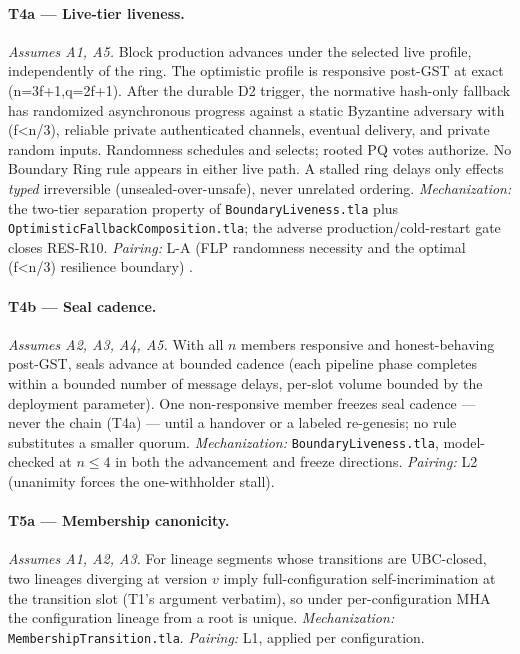 \documentclass[11pt]{article}
\newcommand{\code}[1]{\texttt{#1}}
\begin{document}
\paragraph{T4a --- Live-tier liveness.}
\textit{Assumes A1, A5.} Block production advances under the selected live
profile, independently of the ring. The optimistic profile is responsive
post-GST at exact (n=3f+1,q=2f+1). After the durable D2 trigger, the
normative hash-only fallback has randomized asynchronous progress against a
static Byzantine adversary with (f<n/3), reliable private authenticated
channels, eventual delivery, and private random inputs. Randomness schedules
and selects; rooted PQ votes authorize. No Boundary Ring rule appears in
either live path. A stalled ring delays only effects \emph{typed}
irreversible (unsealed-over-unsafe), never unrelated ordering.
\textit{Mechanization:} the two-tier separation property of
\code{BoundaryLiveness.tla} plus
\code{OptimisticFallbackComposition.tla}; the adverse production/cold-restart
gate closes RES-R10. \textit{Pairing:} L-A (FLP randomness necessity and the
optimal (f<n/3) resilience boundary) \cite{hashasync,hashasynctheory}.

\paragraph{T4b --- Seal cadence.}
\textit{Assumes A2, A3, A4, A5.} With all \(n\) members responsive and
honest-behaving post-GST, seals advance at bounded cadence (each pipeline
phase completes within a bounded number of message delays, per-slot volume
bounded by the deployment parameter). One non-responsive member freezes
seal cadence --- never the chain (T4a) --- until a handover or a labeled
re-genesis; no rule substitutes a smaller quorum.
\textit{Mechanization:} \code{BoundaryLiveness.tla}, model-checked at
\(n \le 4\) in both the advancement and freeze directions.
\textit{Pairing:} L2 (unanimity forces the one-withholder stall).

\paragraph{T5a --- Membership canonicity.}
\textit{Assumes A1, A2, A3.} For lineage segments whose transitions are
UBC-closed, two lineages diverging at version \(v\) imply
full-configuration self-incrimination at the transition slot (T1's
argument verbatim), so under per-configuration MHA the configuration
lineage from a root is unique.
\textit{Mechanization:} \code{MembershipTransition.tla}.
\textit{Pairing:} L1, applied per configuration.
\end{document}

